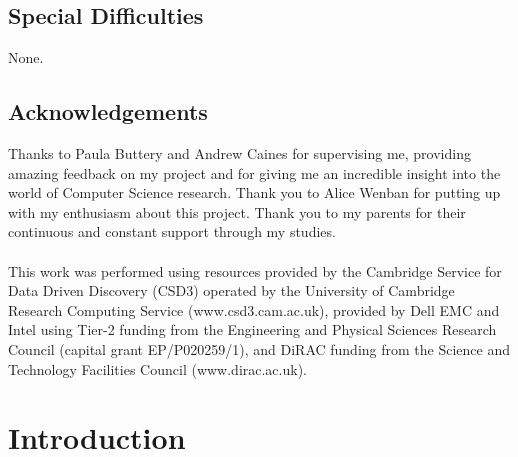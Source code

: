 \documentclass[12pt,a4paper]{report}
\begin{document}
\section*{Special Difficulties}

None.
 
\tableofcontents

\listoffigures

\newpage
\section*{Acknowledgements}

Thanks to Paula Buttery and Andrew Caines for supervising me, providing amazing feedback on my project and for giving me an incredible insight into the world of Computer Science research. Thank you to Alice Wenban for putting up with my enthusiasm about this project. Thank you to my parents for their continuous and constant support through my studies.
\\
\\
This work was performed using resources provided by the Cambridge Service for Data Driven Discovery (CSD3) operated by the University of Cambridge Research Computing Service (www.csd3.cam.ac.uk), provided by Dell EMC and Intel using Tier-2 funding from the Engineering and Physical Sciences Research Council (capital grant EP/P020259/1), and DiRAC funding from the Science and Technology Facilities Council (www.dirac.ac.uk).



\pagestyle{headings}

\chapter{Introduction}
\setcounter{page}{1}
\end{document}
